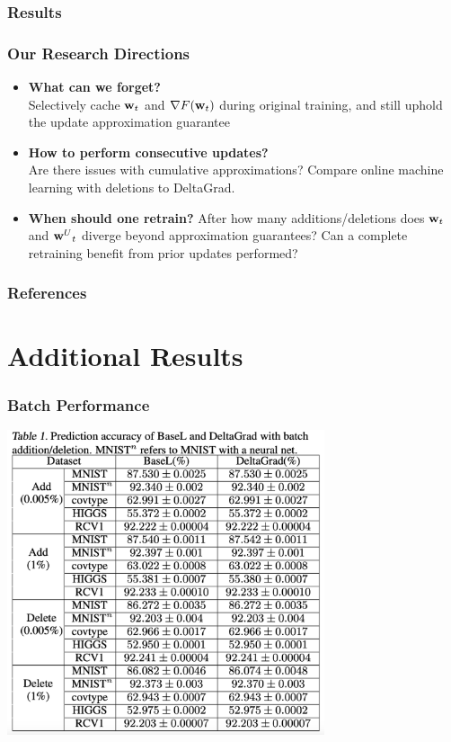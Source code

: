 \documentclass[pdf]{beamer}
\begin{document}
\begin{frame}
  \frametitle{Results}
  \label{results}
  
  \hyperlink{batch-performance}{}
  \hyperlink{Online-Performance}{}
  \hyperlink{large-deletions}{}
  \hyperlink{resnet-results}{}
\end{frame}


\begin{frame}
  \frametitle{Our Research Directions}
  \begin{itemize}
    \item {\bf What can we forget?} \\
    Selectively cache $\textbf{w}_{t}$ and $\nabla F(\textbf{w}_{t})$ during original training, and still uphold the update approximation guarantee
    \item {\bf How to perform consecutive updates?}\\
    Are there issues with cumulative approximations? Compare online machine learning with deletions to DeltaGrad.
    \item {\bf When should one retrain?}
    After how many additions/deletions does $\textbf{w}_{t}$ and ${\textbf{w}^{U}}_{t}$ diverge beyond approximation guarantees? Can a complete retraining benefit from prior updates performed?
  \end{itemize}
  
  
\end{frame}

\begin{frame}[allowframebreaks]
  \frametitle{References}
  
  
\end{frame}

\appendix
\section{Additional Results}
\label{additional}
\begin{frame}
  \frametitle{Batch Performance}
  \label{batch-performance}
  \begin{center}
    \includegraphics[width=0.7\textwidth]{images/Batch results.png}
  \end{center}
\end{frame}
\end{document}
